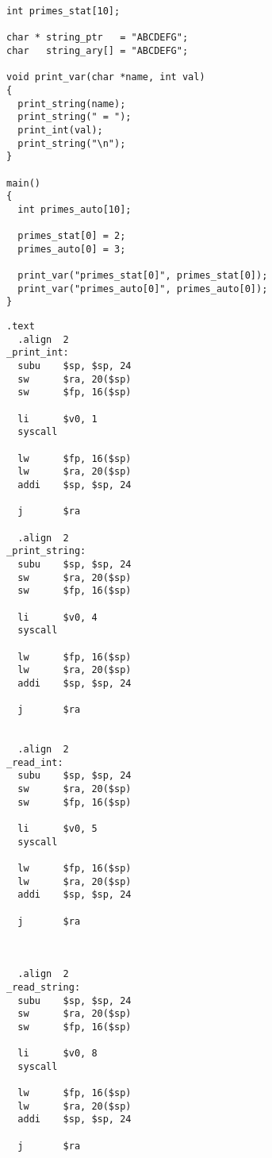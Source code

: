 \documentclass[11pt]{jarticle}
\begin{document}
\begin{lstlisting}[caption=report2-1.c,label=report2-1]
int primes_stat[10];

char * string_ptr   = "ABCDEFG";
char   string_ary[] = "ABCDEFG";

void print_var(char *name, int val)
{
  print_string(name);
  print_string(" = ");
  print_int(val);
  print_string("\n");
}

main()
{
  int primes_auto[10];

  primes_stat[0] = 2;
  primes_auto[0] = 3;

  print_var("primes_stat[0]", primes_stat[0]);
  print_var("primes_auto[0]", primes_auto[0]);
}
\end{lstlisting}

\begin{lstlisting}[caption=syacalls.s,label=syscalls]
  .text
  .align  2
_print_int:
  subu    $sp, $sp, 24
  sw      $ra, 20($sp)
  sw      $fp, 16($sp)

  li      $v0, 1
  syscall

  lw      $fp, 16($sp)
  lw      $ra, 20($sp)
  addi    $sp, $sp, 24

  j       $ra

  .align  2
_print_string:
  subu    $sp, $sp, 24
  sw      $ra, 20($sp)
  sw      $fp, 16($sp)

  li      $v0, 4
  syscall

  lw      $fp, 16($sp)
  lw      $ra, 20($sp)
  addi    $sp, $sp, 24

  j       $ra


  .align  2
_read_int:
  subu    $sp, $sp, 24
  sw      $ra, 20($sp)
  sw      $fp, 16($sp)

  li      $v0, 5
  syscall

  lw      $fp, 16($sp)
  lw      $ra, 20($sp)
  addi    $sp, $sp, 24

  j       $ra

  

  .align  2
_read_string:
  subu    $sp, $sp, 24
  sw      $ra, 20($sp)
  sw      $fp, 16($sp)

  li      $v0, 8
  syscall

  lw      $fp, 16($sp)
  lw      $ra, 20($sp)
  addi    $sp, $sp, 24

  j       $ra
\end{lstlisting}
\end{document}
